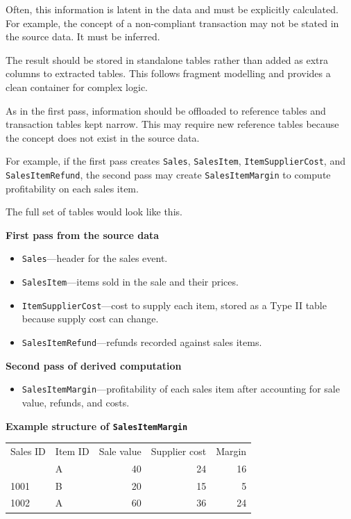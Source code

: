 \documentclass[10pt,openany,10pt]{book}
\providecommand{\tightlist}{%
  \setlength{\itemsep}{0pt}\setlength{\parskip}{0pt}}
\newcounter{none}
\let\podeToprule\toprule
\let\podeMidrule\midrule
\let\podeBottomrule\bottomrule
\renewcommand{\toprule}{\arrayrulecolor{pbiGrid}\podeToprule}
\renewcommand{\midrule}{\arrayrulecolor{pbiGrid}\podeMidrule}
\renewcommand{\bottomrule}{\arrayrulecolor{pbiGrid}\podeBottomrule}
\begin{document}
Often, this information is latent in the data and must be explicitly
calculated. For example, the concept of a non-compliant transaction may
not be stated in the source data. It must be inferred.

The result should be stored in standalone tables rather than added as
extra columns to extracted tables. This follows fragment modelling and
provides a clean container for complex logic.

As in the first pass, information should be offloaded to reference
tables and transaction tables kept narrow. This may require new
reference tables because the concept does not exist in the source data.

For example, if the first pass creates \texttt{Sales},
\texttt{SalesItem}, \texttt{ItemSupplierCost}, and
\texttt{SalesItemRefund}, the second pass may create
\texttt{SalesItemMargin} to compute profitability on each sales item.

The full set of tables would look like this.

\textbf{First pass from the source data}

\begin{itemize}
\tightlist
\item
  \texttt{Sales}---header for the sales event.
\item
  \texttt{SalesItem}---items sold in the sale and their prices.
\item
  \texttt{ItemSupplierCost}---cost to supply each item, stored as a Type
  II table because supply cost can change.
\item
  \texttt{SalesItemRefund}---refunds recorded against sales items.
\end{itemize}

\textbf{Second pass of derived computation}

\begin{itemize}
\tightlist
\item
  \texttt{SalesItemMargin}---profitability of each sales item after
  accounting for sale value, refunds, and costs.
\end{itemize}

\textbf{Example structure of \texttt{SalesItemMargin}}

{\def\LTcaptype{none} %
\begin{longtable}[]{@{}llrrr@{}}
\toprule\noalign{}
Sales ID & Item ID & Sale value & Supplier cost & Margin \\
\midrule\noalign{}
\endhead
\bottomrule\noalign{}
\endlastfoot
1001 & A & 40 & 24 & 16 \\
1001 & B & 20 & 15 & 5 \\
1002 & A & 60 & 36 & 24 \\
\end{longtable}
}
\end{document}
